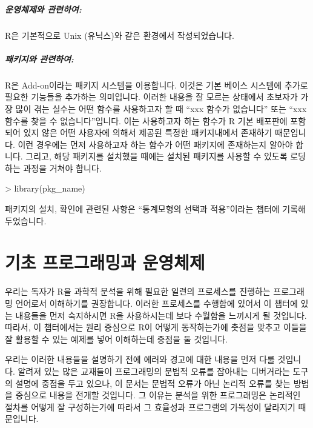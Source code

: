 \documentclass{report}
\begin{document}
\paragraph{운영체제와 관련하여:}
R은 기본적으로 Unix (유닉스)와 같은 환경에서 작성되었습니다. 


\paragraph{패키지와 관련하여: }
R은 Add-on이라는 패키지 시스템을 이용합니다. 
이것은 기본 베이스 시스템에 추가로 필요한 기능들을 추가하는 의미입니다.
이러한 내용을 잘 모르는 상태에서 초보자가 가장 많이 겪는 실수는 어떤 함수를 사용하고자 할 때 ``xxx 함수가 없습니다'' 또는 ``xxx 함수를 찾을 수 없습니다''입니다.
이는 사용하고자 하는 함수가 R 기본 배포판에 포함되어 있지 않은 어떤 사용자에 의해서 제공된 특정한 패키지내에서 존재하기 때문입니다.
이런 경우에는 먼저 사용하고자 하는 함수가 어떤 패키지에 존재하는지 알아야 합니다.  
그리고, 해당 패키지를 설치했을 때에는 설치된 패키지를 사용할 수 있도록 로딩하는 과정을 거쳐야 합니다.

\begin{Schunk}
\begin{Soutput}
> library(pkg_name)	
\end{Soutput}
\end{Schunk}

패키지의 설치, 확인에 관련된 사항은 ``통계모형의 선택과 적용''이라는 챕터에 기록해두었습니다. 




\chapter{기초 프로그래밍과 운영체제}

우리는 독자가 R을 과학적 분석을 위해 필요한 일련의 프로세스를 진행하는 프로그래밍 언어로서 이해하기를 권장합니다.
이러한 프로세스를 수행함에 있어서 이 챕터에 있는 내용들을 먼저 숙지하시면 R을 사용하시는데 보다 수월함을 느끼시게 될 것입니다. 
따라서, 이 챕터에서는 원리 중심으로 R이 어떻게 동작하는가에 촛점을 맞추고 이들을 잘 활용할 수 있는 예제를 넣어 이해하는데 중점을 둘 것입니다. 

우리는 이러한 내용들을 설명하기 전에 에러와 경고에 대한 내용을 먼저 다룰 것입니다. 
알려져 있는 많은 교재들이 프로그래밍의 문법적 오류를 잡아내는 디버거라는 도구의 설명에 중점을 두고 있으나, 이 문서는 문법적 오류가 아닌 논리적 오류를 찾는 방법을 중심으로 내용을 전개할 것입니다. 
그 이유는 분석을 위한 프로그래밍은 논리적인 절차를 어떻게 잘 구성하는가에 따라서 그 효율성과 프로그램의 가독성이 달라지기 때문입니다. 
\end{document}
